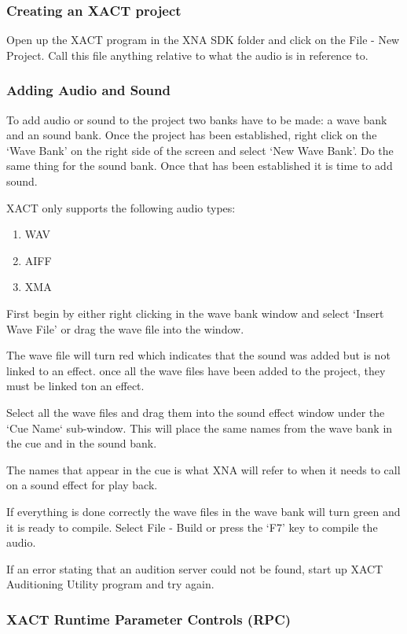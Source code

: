 \subsubsection{Creating an XACT project}

Open up the XACT program in the XNA SDK folder and click on the File - New Project. Call this file anything relative to what the audio is in reference to.

\subsubsection{Adding Audio and Sound}

To add audio or sound to the project two banks have to be made: a wave bank and an sound bank. Once the project has been established, right click on the `Wave Bank' on the right side of the screen and select `New Wave Bank'. Do the same thing for the sound bank. Once that has been established it is time to add sound. 

XACT only supports the following audio types:
\begin{enumerate}
\item WAV
\item AIFF
\item XMA
\end{enumerate}

First begin by either right clicking in the wave bank window and select `Insert Wave File' or drag the wave file into the window.

The wave file will turn red which indicates that the sound was added but is not linked to an effect. once all the wave files have been added to the project, they must be linked ton an effect. 

Select all the wave files and drag them into the sound effect window under the `Cue Name` sub-window. This will place the same names from the wave bank in the cue and in the sound bank.

The names that appear in the cue is what XNA will refer to when it needs to call on a sound effect for play back.

If everything is done correctly the wave files in the wave bank will turn green and it is ready to compile. Select File - Build or press the `F7' key to compile the audio.

If an error stating that an audition server could not be found, start up XACT Auditioning Utility program and try again.

\subsubsection{XACT Runtime Parameter Controls (RPC)}

